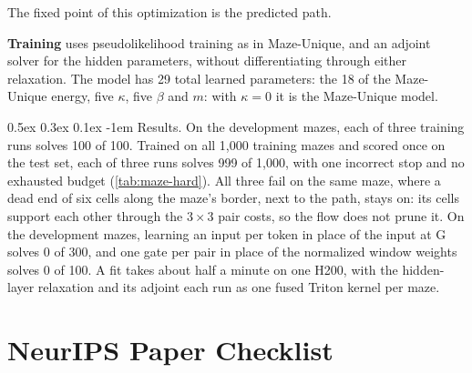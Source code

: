 \documentclass{article}
\makeatletter
\newif\ifmathcolors
\newcommand{\role}[2]{\ifmathcolors{\color{#1}#2}\else{#2}\fi}
\newcommand{\coupling}[1]{\role{CouplingColor}{#1}}
\renewcommand{\paragraph}{%
  \@startsection{paragraph}{4}{\z@}%
                {0.5ex \@plus 0.3ex \@minus 0.1ex}%
                {-1em}%
                {\normalsize\bf}%
}
\makeatother
\begin{document}
The fixed point of this optimization is the predicted path.

\textbf{Training} uses pseudolikelihood training as in Maze-Unique, and an adjoint solver for the hidden parameters, without differentiating through either relaxation.
The model has 29 total learned parameters: the 18 of the Maze-Unique energy, five $\coupling{\kappa}$, five $\coupling{\beta}$ and $\coupling{m}$: with $\coupling{\kappa}=0$ it is the Maze-Unique model.

%
%
%
%
%


\paragraph{Results.}
On the development mazes, each of three training runs solves 100 of 100.
Trained on all 1,000 training mazes and scored once on the test set, each of three runs solves 999 of 1,000, with one incorrect stop and no exhausted budget (\cref{tab:maze-hard}).
All three fail on the same maze, where a dead end of six cells along the maze's border, next to the path, stays on: its cells support each other through the $3\times3$ pair costs, so the flow does not prune it.
On the development mazes, learning an input per token in place of the input at G solves 0 of 300, and one gate per pair in place of the normalized window weights solves 0 of 100.
A fit takes about half a minute on one H200, with the hidden-layer relaxation and its adjoint each run as one fused Triton kernel per maze. \FloatBarrier
 \ifdefined\IncludeChecklist
\clearpage
%
\section*{NeurIPS Paper Checklist}

%
\end{document}
